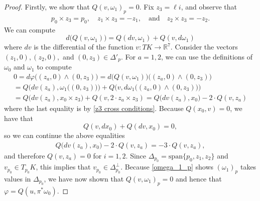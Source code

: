 \documentclass[10pt,a4paper]{amsart}
\begin{document}
\begin{proof}
    Firstly, we show that $Q(v,\omega_1)_{p} = 0$. Fix $z_3 = \ell i$, and observe that 
    \begin{gather}
        \label{z3 cross conditions}
        p_0\times z_3 = p_0, \quad z_1\times z_3 = -z_1,\quad \text{and}\quad z_2\times z_3 = -z_2.
    \end{gather}
    We can compute
    \begin{equation}
        \label{dN}
        d\big(Q(v,\omega_1)\big) = Q(dv,\omega_1) + Q(v,d\omega_1)
    \end{equation}
    where $dv$ is the differential of the function $v:TK\to \mathbb{R}^7$. Consider the vectors $(z_1,0),(z_2,0),$ and $(0,z_3)\in \Delta'_p$. For $a=1,2$, we can use the definitions of $\omega_0$ and $\omega_1$ to compute
    \begin{gather}
        0=d\varphi\big((z_a,0)\wedge(0,z_3)\big) = d\big(Q(v,\omega_1)\big)\big((z_a,0)\wedge(0,z_3)\big) 
        \\
        = Q\Big(dv(z_a), \omega_1\big((0,z_3)\big)\Big) + Q\Big(v,d\omega_1\big((z_a,0)\wedge (0,z_3)\big)\Big)
        \\
        = Q\big(dv(z_a),x_0\times z_3\big) + Q(v, 2\cdot z_a\times z_3)
        = Q\big(dv(z_a),x_0\big) - 2\cdot Q(v, z_a)
    \end{gather}
    where the last equality is by \eqref{z3 cross conditions}. Because $Q(x_0,v)=0$, we have that
    \begin{equation}
    \label{dv cond}
        Q(v,dx_0) + Q(dv,x_0)=0,
    \end{equation} so we can continue the above equalities
    \begin{gather}
        Q\big(dv(z_a),x_0\big) - 2\cdot Q(v, z_a) = - 3\cdot Q(v,z_a),
    \end{gather}
    and therefore $Q(v,z_a) = 0$ for $i=1,2$. Since $\Delta_{p_0} = \mathrm{span}\{p_0,z_1,z_2\}$ and $v_{p_0}\in T_{p_0}K$, this implies that $v_{p_0}\in \Delta^\perp_{p_0}$. Because \eqref{omega_1_p} shows $(\omega_1)_p$ takes values in $\Delta_{p_0}$, we have now shown that $Q(v,\omega_1)_{p}=0$ and hence that $\varphi = Q(u,\pi^*\omega_0)$.


\end{proof}
\end{document}
